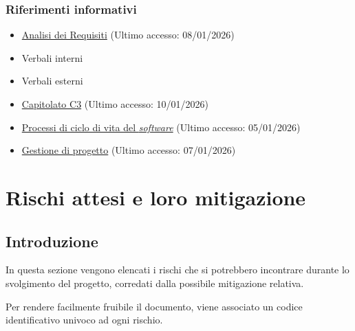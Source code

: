 \documentclass[a4paper,12pt]{article}
\begin{document}
        \subsubsection{Riferimenti informativi}
            \begin{itemize}
                \item \href{https://team-three-technologies.github.io/Documenti/1%20-%20RTB/Analisi_dei_Requisiti_v0_1.pdf}{Analisi dei Requisiti} (Ultimo accesso: 08/01/2026)
                \item Verbali interni
                \item Verbali esterni
                \item \href{https://www.math.unipd.it/~tullio/IS-1/2025/Progetto/C3.pdf}{Capitolato C3} (Ultimo accesso: 10/01/2026)
                \item \href{https://www.math.unipd.it/~tullio/IS-1/2025/Dispense/T02.pdf}{Processi di ciclo di vita del \textit{software}} (Ultimo accesso: 05/01/2026)
                \item \href{https://www.math.unipd.it/~tullio/IS-1/2025/Dispense/T04.pdf}{Gestione di progetto} (Ultimo accesso: 07/01/2026)
            \end{itemize}

\newpage
\section{Rischi attesi e loro mitigazione}
\label{sec:rischi}
    \subsection{Introduzione}
        In questa sezione vengono elencati i rischi che si potrebbero incontrare durante lo svolgimento del progetto, corredati dalla possibile mitigazione relativa.
        
        Per rendere facilmente fruibile il documento, viene associato un codice identificativo univoco ad ogni rischio.
\end{document}
